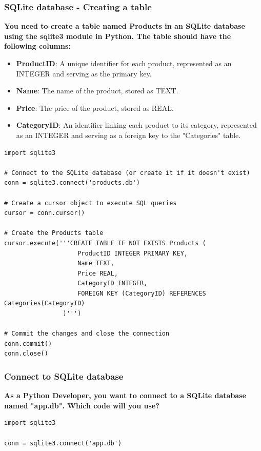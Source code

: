\newpage
\subsubsection{SQLite database - Creating a table}
\textbf{You need to create a table named Products in an SQLite database using the sqlite3 module in Python. The table should have the following columns:}

\begin{itemize}
    \item \textbf{ProductID}: A unique identifier for each product, represented as an INTEGER and serving as the primary key.
    \item \textbf{Name}: The name of the product, stored as TEXT.
    \item \textbf{Price}: The price of the product, stored as REAL.
    \item \textbf{CategoryID}: An identifier linking each product to its category, represented as an INTEGER and serving as a foreign key to the "Categories" table.
\end{itemize}

\begin{codebox}
\begin{verbatim}
import sqlite3

# Connect to the SQLite database (or create it if it doesn't exist)
conn = sqlite3.connect('products.db')

# Create a cursor object to execute SQL queries
cursor = conn.cursor()

# Create the Products table
cursor.execute('''CREATE TABLE IF NOT EXISTS Products (
                    ProductID INTEGER PRIMARY KEY,
                    Name TEXT,
                    Price REAL,
                    CategoryID INTEGER,
                    FOREIGN KEY (CategoryID) REFERENCES Categories(CategoryID)
                )''')

# Commit the changes and close the connection
conn.commit()
conn.close()
\end{verbatim}
\end{codebox}

\subsubsection{Connect to SQLite database}
\textbf{As a Python Developer, you want to connect to a SQLite database named "app.db". Which code will you use?}

\begin{codebox}
\begin{verbatim}
import sqlite3
 
conn = sqlite3.connect('app.db')
\end{verbatim}
\end{codebox}

